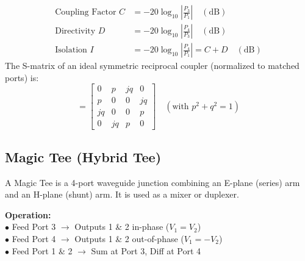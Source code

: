 \documentclass[12pt,a4paper]{article}
\begin{document}
\begin{tcolorbox}[formulabox, title={\textbf{Directional Coupler Metrics \& S-Matrix}}]
\begin{align}
  \text{Coupling Factor } C &= -20 \log_{10} \left| \frac{P_3}{P_1} \right| \quad (\text{dB}) \\
  \text{Directivity } D &= -20 \log_{10} \left| \frac{P_4}{P_3} \right| \quad (\text{dB}) \\
  \text{Isolation } I &= -20 \log_{10} \left| \frac{P_4}{P_1} \right| = C + D \quad (\text{dB})
\end{align}
The S-matrix of an ideal symmetric reciprocal coupler (normalized to matched ports) is:
\begin{equation}
  [S] = \begin{bmatrix} 0 & p & j q & 0 \\ p & 0 & 0 & j q \\ j q & 0 & 0 & p \\ 0 & j q & p & 0 \end{bmatrix} \quad (\text{with } p^2 + q^2 = 1)
\end{equation}
\end{tcolorbox}

\subsection{Magic Tee (Hybrid Tee)}
A Magic Tee is a 4-port waveguide junction combining an E-plane (series) arm and an H-plane (shunt) arm. It is used as a mixer or duplexer.

\begin{tcolorbox}[tikzbox, title={Magic Tee Port Configuration Scheme}]
\begin{minipage}[c]{0.45\linewidth}
\centering
{}
\end{minipage}\hfill
\begin{minipage}[c]{0.5\linewidth}
\raggedright
\textbf{Operation:}\\[3pt]
$\bullet$ Feed Port 3 $\to$ Outputs 1 \& 2 in-phase ($V_1 = V_2$)\\[2pt]
$\bullet$ Feed Port 4 $\to$ Outputs 1 \& 2 out-of-phase ($V_1 = -V_2$)\\[2pt]
$\bullet$ Feed Port 1 \& 2 $\to$ Sum at Port 3, Diff at Port 4
\end{minipage}
\end{tcolorbox}
\end{document}
